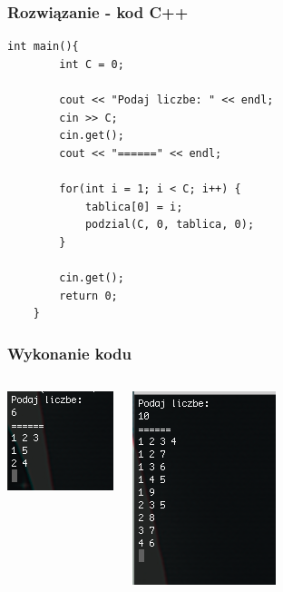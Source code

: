 \documentclass[aspectratio=169]{beamer}
\begin{document}
	\begin{frame}[fragile]
	\frametitle{Rozwiązanie - kod C++}

			\begin{lstlisting}[basicstyle=\footnotesize]
	int main(){   
		int C = 0;
	
		cout << "Podaj liczbe: " << endl;
		cin >> C;
		cin.get();
		cout << "======" << endl;
	
		for(int i = 1; i < C; i++) {
			tablica[0] = i;
			podzial(C, 0, tablica, 0);
		}
	
		cin.get();
		return 0;
	}
			\end{lstlisting}

	
	\end{frame}

	\begin{frame}[fragile]
	\frametitle{Wykonanie kodu}
		\begin{columns}
			\includegraphics[width=.6\linewidth]{source/1.png}
			
			\includegraphics[width=.6\linewidth]{source/2.png}

		\end{columns}
	\end{frame}

	
		
	
\end{document}
